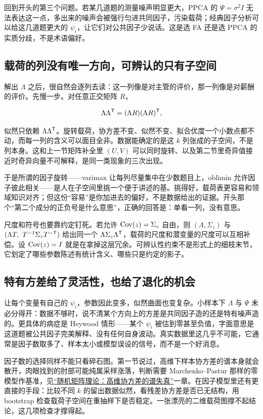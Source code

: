 回到开头的第三个问题。若某几道题的测量噪声明显更大，PPCA 的 \(\Psi=\sigma^2I\) 无法表达这一点，多出来的噪声会被强行匀进共同因子，污染载荷；经典因子分析可以给这几道题更大的 \(\psi_i\)，让它们对公共因子少说话。这是选 FA 还是选 PPCA 的实质分歧，不是术语偏好。

\subsection{载荷的列没有唯一方向，可辨认的只有子空间}

解出 \(\Lambda\) 之后，很自然会逐列去读：这一列像是对主管的评价，那一列像是对薪酬的评价。先慢一步。对任意正交矩阵 \(R\)，

\[
\Lambda\Lambda^{\mathsf{T}} = (\Lambda R)(\Lambda R)^{\mathsf{T}},
\]

似然只依赖 \(\Lambda\Lambda^{\mathsf{T}}\)。旋转载荷，协方差不变、似然不变、拟合优度一个小数点都不动，而每一列的含义可以面目全非。数据能确定的是这 \(k\) 列张成的子空间，不是列本身。这和上一节矩阵补全里 \((U,V)\) 可以同时旋转、以及第二节里奇异值接近时奇异向量不可解释，是同一类现象的三次出现。

于是所谓的因子旋转——varimax 让每列尽量集中在少数题目上，oblimin 允许因子彼此相关——是人在子空间里挑一个便于讲述的基。挑得好，载荷表更容易和领域知识对齐；但这份``容易''是你加进去的偏好，不是数据给出的证据。开头那个``第二个成分的正负号是什么意思''，正确的回答是：单看一列，没有意思。

尺度和符号也要靠约定钉死。若允许 \(\operatorname{Cov}(z)=\Sigma_z\) 自由，则 \((\Lambda,\Sigma_z)\) 与 \((\Lambda T,\ T^{-1}\Sigma_z T^{-\mathsf{T}})\) 给出同一个 \(\Lambda\Sigma_z\Lambda^{\mathsf{T}}\)，载荷的尺度和潜变量的尺度可以互相补偿。设 \(\operatorname{Cov}(z)=I\) 就是在拿掉这层冗余。可辨认性约束不是形式上的细枝末节，它划定了哪些参数陈述有统计含义、哪些只是约定的影子。

\subsection{特有方差给了灵活性，也给了退化的机会}

让每个变量有自己的 \(\psi_i\)，参数因此变多，似然曲面也变复杂。小样本下 \(\Lambda\) 与 \(\Psi\) 未必分得开：数据不够时，说不清某个方向上的方差是共同因子造的还是特有噪声造的。更具体的病症是 Heywood 情形——某个 \(\psi_i\) 被估到零甚至负值，字面意思是这道题被公共因子完美解释、没有任何自身波动。真实数据里这几乎不可能，它通常是因子数取多了、样本太小或模型误设的信号，而不是一个好消息。

因子数的选择同样不能只看碎石图。第一节说过，高维下样本协方差的谱本身就会散开，肉眼找到的肘部可能纯属采样涨落，判断需要 Marchenko--Pastur 那样的零模型作基准，见\hyperref[ch:094]{``随机矩阵理论：高维协方差的谱失真''}一章。在因子模型里还有更直接的手段：比较不同 \(k\) 的留出数据似然，看残差协方差是否已无结构，用 bootstrap 检查载荷子空间在重抽样下是否稳定。一张漂亮的二维载荷图撑不起结论，这几项检查才撑得起。

